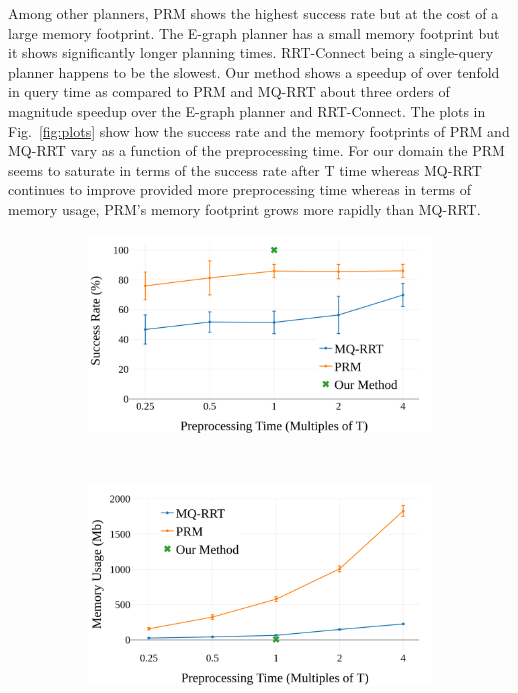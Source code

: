 \documentclass[letterpaper]{article} %
\begin{document}
Among other planners, PRM shows the highest success rate but at the cost of a large memory footprint. The E-graph planner has a small memory footprint but it shows significantly longer planning times. RRT-Connect being a single-query planner happens to be the slowest. Our method shows a speedup of over tenfold in query time as compared to PRM and MQ-RRT about three orders of magnitude speedup over the E-graph planner and RRT-Connect. The plots in Fig.~\ref{fig:plots} show how the success rate and the memory footprints of PRM and MQ-RRT vary as a function of the preprocessing time. For our domain the PRM seems to saturate in terms of the success rate after T time whereas MQ-RRT continues to improve provided more preprocessing time whereas in terms of memory usage, PRM's memory footprint grows more rapidly than MQ-RRT.
\begin{figure}
    \centering
    \begin{subfigure}[b]{0.45\textwidth}
        \includegraphics[width=\textwidth]{success.png}
        \caption{}
        \label{fig:success}
    \end{subfigure}
    ~ %
    \begin{subfigure}[b]{0.45\textwidth}
        \includegraphics[width=\textwidth]{memory.png}

\end{subfigure}
\end{figure}
\end{document}
